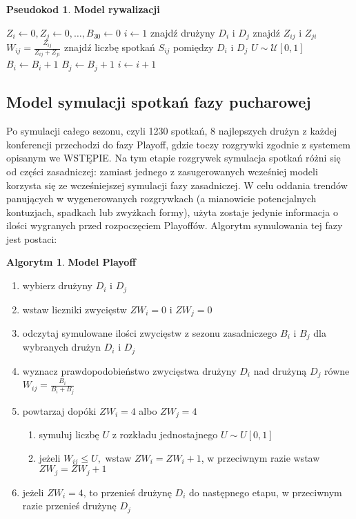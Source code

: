 \documentclass[inzynierska]{pwr_wmat_praca_dyplomowa}
\theoremstyle{plain}
\numberwithin{theorem}{chapter}
\theoremstyle{definition}
\numberwithin{theorem}{chapter}
\newtheorem{algorytm}[theorem]{Algorytm}
\newtheorem{pseudokod}[theorem]{Pseudokod}
\begin{document}
\begin{pseudokod} 
	\textbf{Model rywalizacji}
	\begin{algorithmic}[1]
		\State $Z_i\gets 0,Z_j\gets 0,\dots, B_{30}\gets 0$
		\State $i\gets 1$
		\State znajdź drużyny $D_i$ i $D_j$
		\State znajdź $Z_{ij}$ i $Z_{ji}$ 
		\State $W_{ij}=\frac{Z_{ij}}{Z_{ij}+Z_{ji}}$
		\State znajdź liczbę spotkań $S_{ij}$ pomiędzy $D_i$ i $D_j$
		\State $U\sim \mathcal{U}[0,1]$
		\State $B_i \gets B_i+1$
		\Else
		\State $B_j \gets B_j+1$
		\EndIf
		\EndFor
		\EndFor
		\State $i\gets i+1$
		\EndWhile
	\end{algorithmic}
\end{pseudokod}

\subsection{Model symulacji spotkań fazy pucharowej}
Po symulacji całego sezonu, czyli 1230 spotkań, 8 najlepszych drużyn z każdej konferencji przechodzi do fazy Playoff, gdzie toczy rozgrywki zgodnie z systemem opisanym we WSTĘPIE. Na tym etapie rozgrywek symulacja spotkań różni się od części zasadniczej: zamiast jednego z zasugerowanych wcześniej modeli korzysta się ze wcześniejszej symulacji fazy zasadniczej. W celu oddania trendów panujących w wygenerowanych rozgrywkach (a mianowicie potencjalnych kontuzjach, spadkach lub zwyżkach formy), użyta zostaje jedynie informacja o ilości wygranych przed rozpoczęciem Playoffów. Algorytm symulowania tej fazy jest postaci: 

\begin{algorytm} \textbf{Model Playoff}
	\begin{enumerate}
		\item wybierz drużyny $D_i$ i $D_j$
		\item wstaw liczniki zwycięstw $ZW_i=0$ i $ZW_j=0$
		\item odczytaj symulowane ilości zwycięstw z sezonu zasadniczego $B_i$ i $B_j$ dla wybranych drużyn $D_i$ i $D_j$
		\item wyznacz prawdopodobieństwo zwycięstwa drużyny $D_i$ nad drużyną $D_j$ równe $W_{ij}=\frac{B_i}{B_i + B_j}$
		\item powtarzaj dopóki  $ZW_i=4$ albo $ZW_j=4$
		\begin{enumerate}
			\item symuluj liczbę $U$ z rozkładu jednostajnego $U\sim U[0,1]$ 
			\item jeżeli $W_{ij} \leq U,$ wstaw $ZW_i=ZW_i+1$, w przeciwnym razie wstaw $ZW_j=ZW_j+1$
		\end{enumerate}
		\item jeżeli $ZW_i=4$, to przenieś drużynę $D_i$ do następnego etapu, w przeciwnym razie przenieś drużynę $D_j$
	\end{enumerate}
\end{algorytm} 
\end{document}
